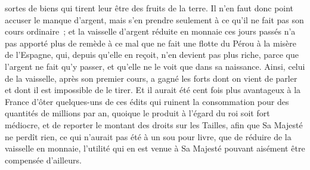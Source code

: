 \documentclass[french,twoside]{book} %
\begin{document}
sortes de biens qui tirent leur être des fruits de la terre. Il n’en faut donc point accuser le manque d’argent, mais s’en prendre seulement à ce qu’il ne fait pas son cours ordinaire ; et la vaisselle d’argent réduite en monnaie ces jours passés n’a pas apporté plus de remède à ce mal que ne fait une flotte du Pérou à la misère de l’Espagne, qui, depuis qu’elle en reçoit, n’en devient pas plus riche, parce que l’argent ne fait qu’y passer, et qu’elle ne le voit que dans sa naissance. Ainsi, celui de la vaisselle, après son premier cours, a gagné les forts dont on vient de parler et dont il est impossible de le tirer. Et il aurait été cent fois plus avantageux à la France d’ôter quelques-uns de ces édits qui ruinent la consommation pour des quantités de millions par an, quoique le produit à l’égard du roi soit fort médiocre, et de reporter le montant des droits sur les Tailles, afin que Sa Majesté ne perdît rien, ce qui n’aurait pas été à un sou pour livre, que de réduire de la vaisselle en monnaie, l’utilité qui en est venue à Sa Majesté pouvant aisément être compensée d’ailleurs.\par
\end{document}
